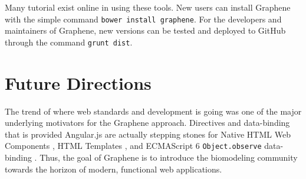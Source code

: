 Many tutorial exist online in using these tools.
New users can install Graphene with the simple command \texttt{bower install graphene}.
For the developers and maintainers of Graphene, new versions can be tested and deployed to GitHub through the command \texttt{grunt dist}.

\section{Future Directions}
The trend of where web standards and development is going was one of the major underlying motivators for the Graphene approach.
Directives and data-binding that is provided Angular.js are actually stepping stones for Native HTML Web Components \autocite{w3c2014components}, HTML Templates \autocite{w3c2014templating}, and ECMAScript 6 \texttt{Object.observe} data-binding \autocite{polymer2014templating}.
Thus, the goal of Graphene is to introduce the biomodeling community towards the horizon of modern, functional web applications.


